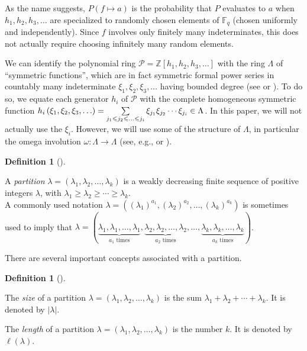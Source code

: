 \documentclass[numbers=enddot,12pt,final,onecolumn,notitlepage]{scrartcl}%
\theoremstyle{definition}
\newtheorem{defi}[theo]{Definition}
\newenvironment{definition}[1][]
{\begin{defi}[#1]\begin{leftbar}}
{\end{leftbar}\end{defi}}
\let\sumnonlimits\sum
\renewcommand{\sum}{\sumnonlimits\limits}
\newcommand{\abs}[1]{\left| #1 \right|}
\newcommand{\tup}[1]{\left( #1 \right)}
\newcommand{\Fq}{\mathbb{F}_q}
\renewcommand{\leq}{\leqslant}
\renewcommand{\geq}{\geqslant}
\theoremstyle{plainsl}
\begin{document}
As the name suggests, $P\tup{f \mapsto a}$ is the probability that
$P$ evaluates to $a$ when $h_1, h_2, h_3, \ldots$ are specialized
to randomly chosen elements of $\Fq$ (chosen uniformly and
independently). Since $f$ involves only finitely many indeterminates,
this does not actually require choosing infinitely many random
elements.

We can identify the polynomial ring
$\mathcal{P}=\mathbb{Z}\left[  h_{1},h_{2},h_{3},\ldots\right]  $
with the ring $\Lambda$ of ``symmetric
functions'', which are in fact symmetric formal power series in
countably many indeterminate $\xi_{1},\xi_{2},\xi_{3},\ldots$
having bounded degree (see \cite[Section 7.1]{EC2} or
\cite[Section I.2]{Macdonald}).
To do so, we equate each generator $h_i$ of $\mathcal{P}$
with the complete homogeneous symmetric function
$h_i\tup{\xi_1, \xi_2, \xi_3, \ldots}
= \sum\limits_{j_1 \leq j_2 \leq \ldots \leq j_i}
\xi_{j_1} \xi_{j_2} \cdots \xi_{j_i} \in \Lambda$.
In this paper, we will not actually use the $\xi_i$.
However, we will use some of the structure of $\Lambda$, in
particular the omega involution $\omega : \Lambda \to \Lambda$
(see, e.g., \cite[Section 7.6]{EC2} or \cite[(I.2.7)]{Macdonald}).

\begin{definition}
A \emph{partition} $\lambda = \left(\lambda_1, \lambda_2, \ldots, \lambda_k\right)$ is a
weakly decreasing finite sequence of positive integers
$\lambda$, with
$\lambda_1 \geq \lambda_2 \geq \cdots \geq \lambda_k$. \\

A commonly used notation $\lambda =((\lambda_1)^{a_1}, (\lambda_2)^{a_2}, \ldots, (\lambda_k)^{a_k})$  is sometimes used to imply that $\lambda = ( \underbrace{\lambda_1,\lambda_1,\ldots,\lambda_1}_{a_1
\text{ times}},  \underbrace{\lambda_2,\lambda_2,\ldots,\lambda_2}_{a_2
\text{ times}}, \ldots, \underbrace{\lambda_k,\lambda_k,\ldots,\lambda_k}_{a_k
\text{ times}}
)$.
\end{definition}


There are several important concepts associated with a partition.

\begin{definition}
The \emph{size} of a partition
$\lambda = \left(\lambda_1, \lambda_2, \ldots, \lambda_k\right)$
is the sum $\lambda_1 + \lambda_2 + \cdots + \lambda_k$.
It is denoted by $\abs{\lambda}$.

The \emph{length} of a partition
$\lambda = \left(\lambda_1, \lambda_2, \ldots, \lambda_k\right)$
is the number $k$.
It is denoted by $\ell\tup{\lambda}$.
\end{definition}
\end{document}
